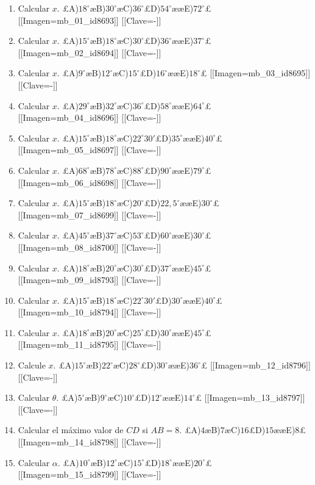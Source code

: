 \begin{enumerate}
\item[\textbf{1.}] Calcular $x$. £A)$18^\circ$æB)$30^\circ$æC)$36^\circ$£D)$54^\circ$ææE)$72^\circ$£ [[Imagen=mb_01_id8693]] [[Clave=-]]

\item[\textbf{2.}] Calcular $x$. £A)$15^\circ$æB)$18^\circ$æC)$30^\circ$£D)$36^\circ$ææE)$37^\circ$£ [[Imagen=mb_02_id8694]] [[Clave=-]]

\item[\textbf{3.}] Calcular $x$. £A)$9^\circ$æB)$12^\circ$æC)$15^\circ$£D)$16^\circ$ææE)$18^\circ$£ [[Imagen=mb_03_id8695]] [[Clave=-]]

\item[\textbf{4.}] Calcular $x$. £A)$29^\circ$æB)$32^\circ$æC)$36^\circ$£D)$58^\circ$ææE)$64^\circ$£ [[Imagen=mb_04_id8696]] [[Clave=-]]

\item[\textbf{5.}] Calcular $x$. £A)$15^\circ$æB)$18^\circ$æC)$22^\circ30'$£D)$35^\circ$ææE)$40^\circ$£ [[Imagen=mb_05_id8697]] [[Clave=-]]

\item[\textbf{6.}] Calcular $x$. £A)$68^\circ$æB)$78^\circ$æC)$88^\circ$£D)$90^\circ$ææE)$79^\circ$£ [[Imagen=mb_06_id8698]] [[Clave=-]]

\item[\textbf{7.}] Calcular $x$. £A)$15^\circ$æB)$18^\circ$æC)$20^\circ$£D)$22,5^\circ$ææE)$30^\circ$£ [[Imagen=mb_07_id8699]] [[Clave=-]]

\item[\textbf{8.}] Calcular $x$. £A)$45^\circ$æB)$37^\circ$æC)$53^\circ$£D)$60^\circ$ææE)$30^\circ$£ [[Imagen=mb_08_id8700]] [[Clave=-]]

\item[\textbf{1.}] Calcular $x$. £A)$18^\circ$æB)$20^\circ$æC)$30^\circ$£D)$37^\circ$ææE)$45^\circ$£ [[Imagen=mb_09_id8793]] [[Clave=-]]

\item[\textbf{2.}] Calcular $x$. £A)$15^\circ$æB)$18^\circ$æC)$22^\circ30'$£D)$30^\circ$ææE)$40^\circ$£ [[Imagen=mb_10_id8794]] [[Clave=-]]

\item[\textbf{3.}] Calcular $x$. £A)$18^\circ$æB)$20^\circ$æC)$25^\circ$£D)$30^\circ$ææE)$45^\circ$£ [[Imagen=mb_11_id8795]] [[Clave=-]]

\item[\textbf{4.}] Calcule $x$. £A)$15^\circ$æB)$22^\circ$æC)$28^\circ$£D)$30^\circ$ææE)$36^\circ$£ [[Imagen=mb_12_id8796]] [[Clave=-]]

\item[\textbf{5.}] Calcular $\theta$. £A)$5^\circ$æB)$9^\circ$æC)$10^\circ$£D)$12^\circ$ææE)$14^\circ$£ [[Imagen=mb_13_id8797]] [[Clave=-]]

\item[\textbf{6.}] Calcular el máximo valor de $CD$ si $AB=8$. £A)$4$æB)$7$æC)$16$£D)$15$ææE)$8$£ [[Imagen=mb_14_id8798]] [[Clave=-]]

\item[\textbf{7.}] Calcular $\alpha$. £A)$10^\circ$æB)$12^\circ$æC)$15^\circ$£D)$18^\circ$ææE)$20^\circ$£ [[Imagen=mb_15_id8799]] [[Clave=-]]
\end{enumerate}
